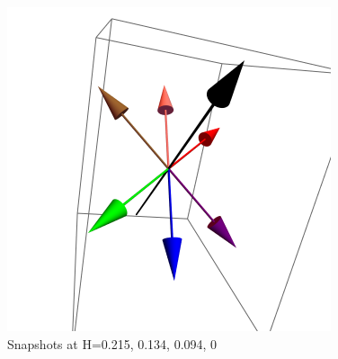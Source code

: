 \documentclass{article}
\begin{document}
\begin{figure}[ht]
\includegraphics[scale=0.37]{HVariedData/Pictures/011Dec216.png}
\caption{Snapshots at H=0.215, 0.134, 0.094, 0}
\end{figure}
\end{document}
